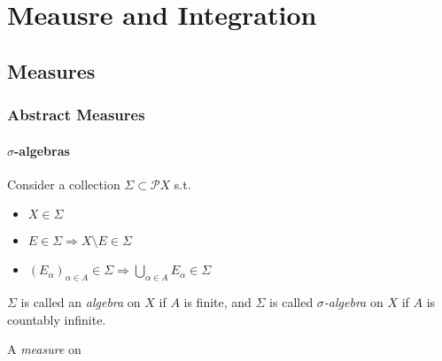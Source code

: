 \part{Meausre and Integration}

\chapter{Measures}

\section{Abstract Measures}

\subsection{\texorpdfstring{\(\sigma\)}{sigma}-algebras}

\begin{definition}
    Consider a collection \( \Sigma \subset \mathcal{P}X \) s.t.
    \begin{itemize}
        \item \( X \in \Sigma \)
        \item \( E \in \Sigma \Rightarrow X \setminus E \in \Sigma \)
        \item \( \left( E_\alpha \right)_{\alpha \in A} \in \Sigma \Rightarrow \bigcup_{\alpha \in A} E_{\alpha} \in \Sigma \) 
    \end{itemize}
    \(\Sigma\) is called an \emph{algebra} on \(X\) if \(A\) is finite, and \(\Sigma\) is called \emph{\(\sigma\)-algebra} on \(X\) if \(A\) is countably infinite.
\end{definition}

\begin{definition}
    A \emph{measure} on 
\end{definition}
